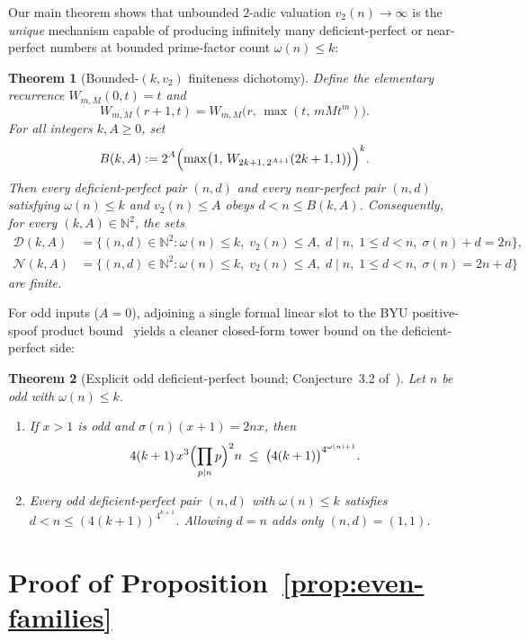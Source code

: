 \documentclass[11pt]{amsart}
\newtheorem{theorem}{Theorem}
\theoremstyle{definition}
\theoremstyle{remark}
\begin{document}
Our main theorem shows that unbounded $2$-adic valuation $v_2(n) \to \infty$ is the \emph{unique} mechanism capable of producing infinitely many deficient-perfect or near-perfect numbers at bounded prime-factor count $\omega(n) \le k$:

\begin{theorem}[Bounded-$(k, v_2)$ finiteness dichotomy]\label{thm:main}
Define the elementary recurrence $W_{m, M}(0, t) = t$ and
\[
  W_{m, M}(r + 1, t) = W_{m, M}\bigl(r,\, \max(t,\, m M t^m)\bigr).
\]
For all integers $k, A \ge 0$, set
\[
  B(k, A) := 2^A \Bigl(\max\bigl(1,\, W_{2k+1,\, 2^{A+1}}(2k + 1, 1)\bigr)\Bigr)^k.
\]
Then every deficient-perfect pair $(n, d)$ and every near-perfect pair $(n, d)$ satisfying $\omega(n) \le k$ and $v_2(n) \le A$ obeys $d < n \le B(k, A)$. Consequently, for every $(k, A) \in \mathbb{N}^2$, the sets
\begin{align*}
  \mathcal{D}(k, A) &= \{(n, d) \in \mathbb{N}^2 : \omega(n) \le k,\; v_2(n) \le A,\; d \mid n,\; 1 \le d < n,\; \sigma(n) + d = 2n\}, \\
  \mathcal{N}(k, A) &= \{(n, d) \in \mathbb{N}^2 : \omega(n) \le k,\; v_2(n) \le A,\; d \mid n,\; 1 \le d < n,\; \sigma(n) = 2n + d\}
\end{align*}
are finite.
\end{theorem}

For odd inputs ($A = 0$), adjoining a single formal linear slot to the BYU positive-spoof product bound~\cite{BYU2022} yields a cleaner closed-form tower bound on the deficient-perfect side:

\begin{theorem}[Explicit odd deficient-perfect bound; Conjecture~3.2 of~\cite{DuttaSaikia2020}]\label{thm:odd-explicit}
Let $n$ be odd with $\omega(n) \le k$.
\begin{enumerate}
  \item If $x > 1$ is odd and $\sigma(n)(x + 1) = 2nx$, then
  \[
    4(k + 1)\, x^3 \Bigl(\prod_{p \mid n} p\Bigr)^2 n \;\le\; \bigl(4(k + 1)\bigr)^{4^{\omega(n) + 1}}.
  \]
  \item Every odd deficient-perfect pair $(n, d)$ with $\omega(n) \le k$ satisfies $d < n \le (4(k + 1))^{4^{k+1}}$. Allowing $d = n$ adds only $(n, d) = (1, 1)$.
\end{enumerate}
\end{theorem}

\section{Proof of Proposition~\ref{prop:even-families}}
\end{document}
